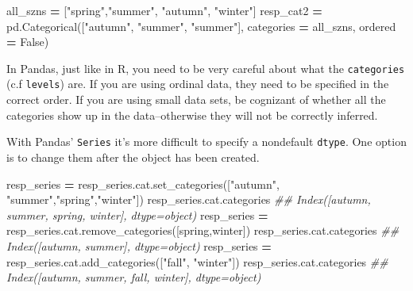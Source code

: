 \documentclass[
  12pt,
]{krantz}
\makeatletter
\newenvironment{Shaded}{\begin{snugshade}}{\end{snugshade}}
\newcommand{\CommentTok}[1]{\textcolor[rgb]{0.37,0.37,0.37}{\textit{#1}}}
\newcommand{\NormalTok}[1]{#1}
\newcommand{\OperatorTok}[1]{\textcolor[rgb]{0.43,0.43,0.43}{\textbf{#1}}}
\newcommand{\StringTok}[1]{\textcolor[rgb]{0.5,0.5,0.5}{#1}}
\newcommand{\VariableTok}[1]{\textcolor[rgb]{0,0,0}{#1}}
\newenvironment{kframe}{%
\medskip{}
\setlength{\fboxsep}{.8em}
 \def\at@end@of@kframe{}%
 \ifinner\ifhmode%
  \def\at@end@of@kframe{\end{minipage}}%
  \begin{minipage}{\columnwidth}%
 \fi\fi%
 \def\FrameCommand##1{\hskip\@totalleftmargin \hskip-\fboxsep
 \colorbox{shadecolor}{##1}\hskip-\fboxsep
     \hskip-\linewidth \hskip-\@totalleftmargin \hskip\columnwidth}%
 \MakeFramed {\advance\hsize-\width
   \@totalleftmargin\z@ \linewidth\hsize
   \@setminipage}}%
 {\par\unskip\endMakeFramed%
 \at@end@of@kframe}
\renewenvironment{Shaded}{\begin{kframe}}{\end{kframe}}
\makeatother
\begin{document}
\begin{Shaded}
\begin{Highlighting}[]
\NormalTok{all\_szns }\OperatorTok{=}\NormalTok{ [}\StringTok{"spring"}\NormalTok{,}\StringTok{"summer"}\NormalTok{, }\StringTok{"autumn"}\NormalTok{, }\StringTok{"winter"}\NormalTok{]}
\NormalTok{resp\_cat2 }\OperatorTok{=}\NormalTok{ pd.Categorical([}\StringTok{"autumn"}\NormalTok{, }\StringTok{"summer"}\NormalTok{, }\StringTok{"summer"}\NormalTok{], }
\NormalTok{                            categories }\OperatorTok{=}\NormalTok{ all\_szns, }
\NormalTok{                            ordered }\OperatorTok{=} \VariableTok{False}\NormalTok{)}
\end{Highlighting}
\end{Shaded}

In Pandas, just like in R, you need to be very careful about what the \texttt{categories} (c.f \texttt{levels}) are. If you are using ordinal data, they need to be specified in the correct order. If you are using small data sets, be cognizant of whether all the categories show up in the data--otherwise they will not be correctly inferred.

With Pandas' \texttt{Series} it's more difficult to specify a nondefault \texttt{dtype}. One option is to change them after the object has been created.

\begin{Shaded}
\begin{Highlighting}[]
\NormalTok{resp\_series }\OperatorTok{=}\NormalTok{ resp\_series.cat.set\_categories([}\StringTok{"autumn"}\NormalTok{, }\StringTok{"summer"}\NormalTok{,}\StringTok{"spring"}\NormalTok{,}\StringTok{"winter"}\NormalTok{])}
\NormalTok{resp\_series.cat.categories}
\CommentTok{\#\# Index([\textquotesingle{}autumn\textquotesingle{}, \textquotesingle{}summer\textquotesingle{}, \textquotesingle{}spring\textquotesingle{}, \textquotesingle{}winter\textquotesingle{}], dtype=\textquotesingle{}object\textquotesingle{})}
\NormalTok{resp\_series }\OperatorTok{=}\NormalTok{ resp\_series.cat.remove\_categories([}\StringTok{\textquotesingle{}spring\textquotesingle{}}\NormalTok{,}\StringTok{\textquotesingle{}winter\textquotesingle{}}\NormalTok{])}
\NormalTok{resp\_series.cat.categories}
\CommentTok{\#\# Index([\textquotesingle{}autumn\textquotesingle{}, \textquotesingle{}summer\textquotesingle{}], dtype=\textquotesingle{}object\textquotesingle{})}
\NormalTok{resp\_series }\OperatorTok{=}\NormalTok{ resp\_series.cat.add\_categories([}\StringTok{"fall"}\NormalTok{, }\StringTok{"winter"}\NormalTok{])}
\NormalTok{resp\_series.cat.categories}
\CommentTok{\#\# Index([\textquotesingle{}autumn\textquotesingle{}, \textquotesingle{}summer\textquotesingle{}, \textquotesingle{}fall\textquotesingle{}, \textquotesingle{}winter\textquotesingle{}], dtype=\textquotesingle{}object\textquotesingle{})}
\end{Highlighting}
\end{Shaded}
\end{document}
